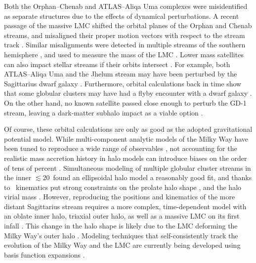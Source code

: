 \documentclass[final,5p,times,twocolumn,authoryear]{elsarticle}
\begin{document}
Both the Orphan--Chenab and ATLAS--Aliqa Uma complexes were misidentified as separate structures due to the effects of dynamical perturbations.
A recent passage of the massive LMC shifted the orbital planes of the Orphan and Chenab streams, and misaligned their proper motion vectors with respect to the stream track \citep{erkal:2019}.
Similar misalignments were detected in multiple streams of the southern hemisphere \citep{shipp:2019}, and used to measure the mass of the LMC \citep[$\gtrsim10^{11}\,\unit{\msun}$;][]{erkal:2019, shipp:2021, koposov:2023}.
Lower mass satellites can also impact stellar streams if their orbits intersect \citep[e.g.,][]{dillamore:2022}.
For example, both ATLAS--Aliqa Uma and the Jhelum stream may have been perturbed by the Sagittarius dwarf galaxy \citep[respectively]{li:2019,woudenberg:2023}.
Furthermore, orbital calculations back in time show that some globular clusters may have had a flyby encounter with a dwarf galaxy \citep{garrow:2020, el-falou:2022}.
On the other hand, no known satellite passed close enough to perturb the GD-1 stream, leaving a dark-matter subhalo impact as a viable option \citep{bonaca:2019, doke:2022}.

Of course, these orbital calculations are only as good as the adopted gravitational potential model.
While multi-component analytic models of the Milky Way have been tuned to reproduce a wide range of observables \citep[e.g.,][]{bovy:2015, mcmillan:2017,price-whelan:2017}, not accounting for the realistic mass accretion history in halo models can introduce biases on the order of tens of percent \citep[e.g.,][]{bonaca:2014, dsouza:2022, arora:2022, santistevan:2024}.
Simultaneous modeling of multiple globular cluster streams in the inner $\lesssim20$\,\unit{\kpc} found an ellipsoidal halo model a reasonably good fit, and thanks to \gaia\ kinematics put strong constraints on the prolate halo shape \citep[$q_z=1.06\pm0.06$;][]{palau:2023}, and the halo virial mass \citep[$M_{200}=1.09^{+0.19}_{-0.14}\times10^{12}\,\unit{\msun}$;][see also \citealt{reino:2021}]{ibata:2023}.
However, reproducing the positions and kinematics of the more distant Sagittarius stream requires a more complex, time-dependent model with an oblate inner halo, triaxial outer halo, as well as a massive LMC on its first infall \citep{vasiliev:2021,kang:2023}.
This change in the halo shape is likely due to the LMC deforming the Milky Way's outer halo \citep[e.g.,][]{garavito-camargo:2019,shao:2021,vasiliev:2023}.
Modeling techniques that self-consistently track the evolution of the Milky Way and the LMC are currently being developed using basis function expansions \citep[e.g.,][]{sanders:2020,garavito-camargo:2021,lilleengen:2023}.
\end{document}
